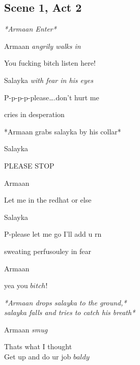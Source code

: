 \documentclass[12pt]{article}
\begin{document}
\subsection*{Scene 1, Act 2}
\begin{center}
    \textit{*Armaan Enter*}
\end{center}

Armaan
\textit{ angrily walks in}
\begin{center}
    You fucking bitch listen here!
\end{center}

Salayka
\textit{  with fear in his eyes}
\begin{center}
P-p-p-p-please….don’t hurt me
\end{center}

\begin{flushright}
    cries in desperation\\
\end{flushright}

\begin{center}
    *Armaan grabs salayka by his collar*\\
\end{center}

Salayka
\begin{center}
    PLEASE STOP
\end{center}

Armaan
\begin{center}
    Let me in the redhat or else
\end{center}

Salayka
\begin{center}
    P-please let me go I’ll add u rn
\end{center}

\begin{flushright}
    sweating perfusouley in fear
\end{flushright}

Armaan
\begin{center}
    yea you $bitch!$\\
\end{center}

\begin{center}
    \textit{*Armaan drops salayka to the ground,*\\salayka falls and tries to catch his breath*}
\end{center}

Armaan
\textit{ smug}
\begin{center}
    Thats what I thought\\Get up and do ur job $baldy$
\end{center}
\end{document}
